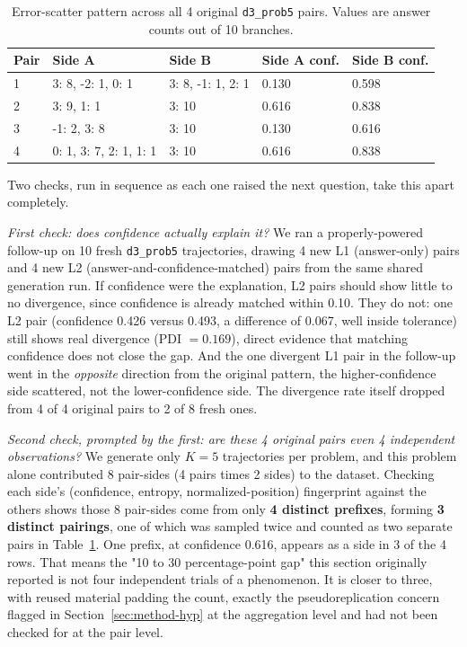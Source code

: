 \documentclass{article}
\begin{document}
\begin{table}[h]
\centering
\caption{Error-scatter pattern across all 4 original \texttt{d3\_prob5} pairs. Values are answer counts out of 10 branches.}
\label{tab:errorscatter}
\begin{tabular}{lllll}
\toprule
Pair & Side A & Side B & Side A conf. & Side B conf. \\
\midrule
1 & 3: 8, -2: 1, 0: 1 & 3: 8, -1: 1, 2: 1 & 0.130 & 0.598 \\
2 & 3: 9, 1: 1 & 3: 10 & 0.616 & 0.838 \\
3 & -1: 2, 3: 8 & 3: 10 & 0.130 & 0.616 \\
4 & 0: 1, 3: 7, 2: 1, 1: 1 & 3: 10 & 0.616 & 0.838 \\
\bottomrule
\end{tabular}
\end{table}

Two checks, run in sequence as each one raised the next question, take this apart completely.

\emph{First check: does confidence actually explain it?} We ran a properly-powered follow-up on 10 fresh \texttt{d3\_prob5} trajectories, drawing 4 new L1 (answer-only) pairs and 4 new L2 (answer-and-confidence-matched) pairs from the same shared generation run. If confidence were the explanation, L2 pairs should show little to no divergence, since confidence is already matched within 0.10. They do not: one L2 pair (confidence 0.426 versus 0.493, a difference of 0.067, well inside tolerance) still shows real divergence (PDI $=0.169$), direct evidence that matching confidence does not close the gap. And the one divergent L1 pair in the follow-up went in the \emph{opposite} direction from the original pattern, the higher-confidence side scattered, not the lower-confidence side. The divergence rate itself dropped from 4 of 4 original pairs to 2 of 8 fresh ones.

\emph{Second check, prompted by the first: are these 4 original pairs even 4 independent observations?} We generate only $K=5$ trajectories per problem, and this problem alone contributed 8 pair-sides (4 pairs times 2 sides) to the dataset. Checking each side's (confidence, entropy, normalized-position) fingerprint against the others shows those 8 pair-sides come from only \textbf{4 distinct prefixes}, forming \textbf{3 distinct pairings}, one of which was sampled twice and counted as two separate pairs in Table~\ref{tab:errorscatter}. One prefix, at confidence 0.616, appears as a side in 3 of the 4 rows. That means the "10 to 30 percentage-point gap" this section originally reported is not four independent trials of a phenomenon. It is closer to three, with reused material padding the count, exactly the pseudoreplication concern flagged in Section~\ref{sec:method-hyp} at the aggregation level and had not been checked for at the pair level.
\end{document}
